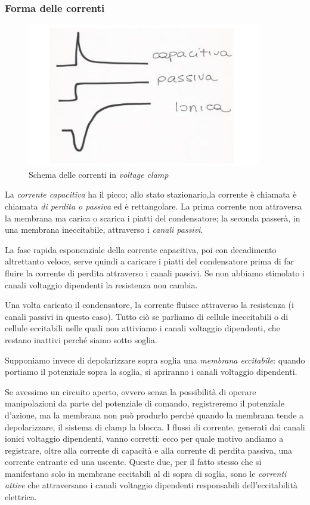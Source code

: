 \documentclass[a4paper,12pt]{article}
\begin{document}
\subsubsection{Forma delle correnti}
\begin{figure}[H]
\centering
\includegraphics[scale=0.5]{immagine/correnti.jpg}
\caption{Schema delle correnti in \emph{voltage clamp}}
\end{figure}

La \emph{corrente capacitiva} ha il picco; allo stato stazionario,la corrente è chiamata è chiamata \emph{di perdita o passiva} ed è rettangolare.
La prima corrente non attraversa la membrana ma carica o scarica i piatti del condensatore; la seconda passerà, in una membrana ineccitabile, attraverso i \emph{canali passivi}. 

La fase rapida esponenziale della corrente capacitiva, poi con decadimento altrettanto veloce, serve quindi a caricare i piatti del condensatore prima di far fluire la corrente di perdita attraverso i canali passivi. Se non abbiamo stimolato i canali voltaggio dipendenti la resistenza non cambia.

Una volta caricato il condensatore, la corrente fluisce attraverso la resistenza (i canali passivi in questo caso). Tutto ciò se parliamo di cellule ineccitabili o di cellule eccitabili nelle quali non attiviamo i canali voltaggio dipendenti, che restano inattivi perché siamo sotto soglia. 

Supponiamo invece di depolarizzare sopra soglia una \emph{membrana eccitabile}: quando portiamo il potenziale sopra la soglia, si apriranno i canali voltaggio dipendenti.

Se avessimo un circuito aperto, ovvero senza la possibilità di operare manipolazioni da parte del potenziale di comando, registreremo il potenziale d’azione, ma la membrana non può produrlo perché quando la membrana tende a depolarizzare, il sistema di clamp la blocca. I flussi di corrente, generati dai canali ionici voltaggio dipendenti, vanno corretti: ecco per quale motivo andiamo a registrare, oltre alla corrente di capacità e alla corrente di perdita passiva, una corrente entrante ed una uscente. Queste due, per il fatto stesso che si manifestano solo in membrane eccitabili al di sopra di soglia, sono le \emph{correnti attive} che attraversano i canali voltaggio dipendenti responsabili dell’eccitabilità elettrica.
\end{document}
